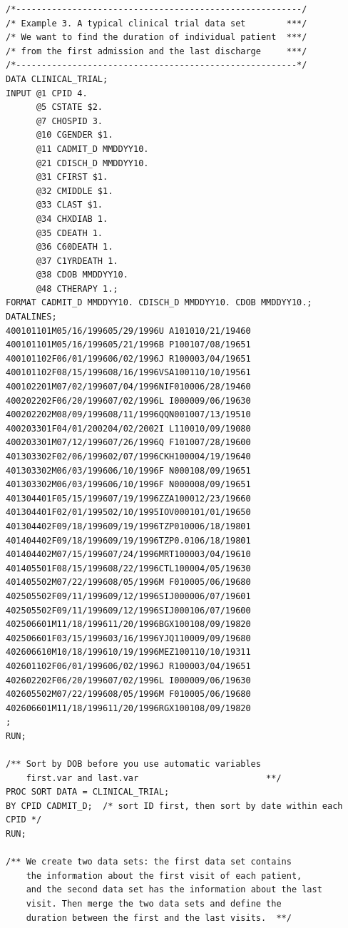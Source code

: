 \documentclass[
]{book}
\begin{document}
\begin{verbatim}
/*--------------------------------------------------------/
/* Example 3. A typical clinical trial data set        ***/
/* We want to find the duration of individual patient  ***/
/* from the first admission and the last discharge     ***/
/*-------------------------------------------------------*/
DATA CLINICAL_TRIAL;
INPUT @1 CPID 4. 
      @5 CSTATE $2. 
      @7 CHOSPID 3.
      @10 CGENDER $1.
      @11 CADMIT_D MMDDYY10.
      @21 CDISCH_D MMDDYY10.
      @31 CFIRST $1. 
      @32 CMIDDLE $1. 
      @33 CLAST $1.
      @34 CHXDIAB 1.
      @35 CDEATH 1. 
      @36 C60DEATH 1. 
      @37 C1YRDEATH 1.
      @38 CDOB MMDDYY10.
      @48 CTHERAPY 1.; 
FORMAT CADMIT_D MMDDYY10. CDISCH_D MMDDYY10. CDOB MMDDYY10.;
DATALINES;
400101101M05/16/199605/29/1996U A101010/21/19460
400101101M05/16/199605/21/1996B P100107/08/19651
400101102F06/01/199606/02/1996J R100003/04/19651
400101102F08/15/199608/16/1996VSA100110/10/19561
400102201M07/02/199607/04/1996NIF010006/28/19460
400202202F06/20/199607/02/1996L I000009/06/19630
400202202M08/09/199608/11/1996QQN001007/13/19510
400203301F04/01/200204/02/2002I L110010/09/19080
400203301M07/12/199607/26/1996Q F101007/28/19600
401303302F02/06/199602/07/1996CKH100004/19/19640
401303302M06/03/199606/10/1996F N000108/09/19651
401303302M06/03/199606/10/1996F N000008/09/19651
401304401F05/15/199607/19/1996ZZA100012/23/19660
401304401F02/01/199502/10/1995IOV000101/01/19650
401304402F09/18/199609/19/1996TZP010006/18/19801
401404402F09/18/199609/19/1996TZP0.0106/18/19801
401404402M07/15/199607/24/1996MRT100003/04/19610
401405501F08/15/199608/22/1996CTL100004/05/19630
401405502M07/22/199608/05/1996M F010005/06/19680
402505502F09/11/199609/12/1996SIJ000006/07/19601
402505502F09/11/199609/12/1996SIJ000106/07/19600
402506601M11/18/199611/20/1996BGX100108/09/19820
402506601F03/15/199603/16/1996YJQ110009/09/19680
402606610M10/18/199610/19/1996MEZ100110/10/19311
402601102F06/01/199606/02/1996J R100003/04/19651
402602202F06/20/199607/02/1996L I000009/06/19630
402605502M07/22/199608/05/1996M F010005/06/19680
402606601M11/18/199611/20/1996RGX100108/09/19820
;
RUN;

/** Sort by DOB before you use automatic variables
    first.var and last.var                         **/
PROC SORT DATA = CLINICAL_TRIAL;
BY CPID CADMIT_D;  /* sort ID first, then sort by date within each CPID */
RUN;

/** We create two data sets: the first data set contains
    the information about the first visit of each patient, 
    and the second data set has the information about the last 
    visit. Then merge the two data sets and define the
    duration between the first and the last visits.  **/


\end{verbatim}
\end{document}
